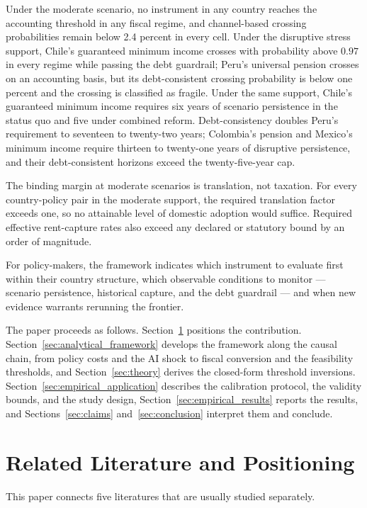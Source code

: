 \documentclass[11pt,a4paper]{article}
\begin{document}
Under the moderate scenario, no instrument in any country reaches the accounting threshold in any fiscal regime, and channel-based crossing probabilities remain below 2.4 percent in every cell. Under the disruptive stress support, Chile's guaranteed minimum income crosses with probability above $0.97$ in every regime while passing the debt guardrail; Peru's universal pension crosses on an accounting basis, but its debt-consistent crossing probability is below one percent and the crossing is classified as fragile. Under the same support, Chile's guaranteed minimum income requires six years of scenario persistence in the status quo and five under combined reform. Debt-consistency doubles Peru's requirement to seventeen to twenty-two years; Colombia's pension and Mexico's minimum income require thirteen to twenty-one years of disruptive persistence, and their debt-consistent horizons exceed the twenty-five-year cap.

The binding margin at moderate scenarios is translation, not taxation. For every country-policy pair in the moderate support, the required translation factor exceeds one, so no attainable level of domestic adoption would suffice. Required effective rent-capture rates also exceed any declared or statutory bound by an order of magnitude.

For policy-makers, the framework indicates which instrument to evaluate first within their country structure, which observable conditions to monitor --- scenario persistence, historical capture, and the debt guardrail --- and when new evidence warrants rerunning the frontier.

The paper proceeds as follows. Section~\ref{sec:literature} positions the
contribution. Section~\ref{sec:analytical_framework} develops the framework
along the causal chain, from policy costs and the AI shock to fiscal
conversion and the feasibility thresholds, and Section~\ref{sec:theory}
derives the closed-form threshold inversions.
Section~\ref{sec:empirical_application} describes the calibration protocol,
the validity bounds, and the study design,
Section~\ref{sec:empirical_results} reports the results, and
Sections~\ref{sec:claims} and~\ref{sec:conclusion} interpret them and
conclude.

\section{Related Literature and Positioning}\label{sec:literature}

This paper connects five literatures that are usually studied separately.
\end{document}
